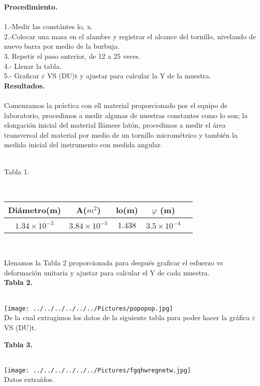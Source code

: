 \documentclass[10pt,a4paper]{article}
\begin{document}
\pagebreak 

\textbf{Procedimiento.}\\
\\
1.-Medir las const\'{a}ntes lo, x.\\
2.-Colocar una masa en el alambre y registrar el alcance del tornillo, nivelando de nuevo barra por medio de la burbuja.\\
3. Repetir el paso anterior, de 12 a 25 veces.\\
4.- Llenar la tabla.\\
5.- Graficar $\varepsilon$ VS (DU)t y ajustar para calcular la Y de la muestra.\\

\textbf{Resultados.}\\
\\
Comenzamos la pr\'{a}ctica con ell material proporcionado por el equipo de laboratorio, procedimos a medir algunas de nuestras constantes como lo son; la elongaci\'{o}n inicial del material ll\'{a}mese lat\'{o}n, procedimos a medir el \'{a}rea transversal del material por medio de un tornillo microm\'{e}trico y tambi\'{e}n la medida inicial del instrumento con medida angular. \\
\medskip
\\
\medskip
\medskip
\caption{Tabla 1.} 
\\
\begin{tabular}{|c|c|c|c|c|}
\hline 
Di\'{a}metro(m) & A(${ m }^{ 2 }$) & lo(m)& $\varphi$ (m)\\ 
\hline 
${ 1.34\times 10 }^{ -3 }$ & ${ 3.84\times 10 }^{ -5 }$ & 1.438 & ${ 3.5\times 10 }^{ -4 }$ \\
\hline 
\end{tabular}\\


\medskip

Llenamos la Tabla 2 proporcionada para despu\'{e}s graficar el esfuerzo vs deformaci\'{o}n unitaria y ajustar para calcular el Y de cada muestra.\\
\textbf{Tabla 2.}\\
\\
\begin{figure 2}
\centering
\texttt{[image: ../../../../../../Pictures/popopop.jpg]} 
\\
\caption{De la cual extragimos los datos de la siguiente tabla para poder hacer la gr\'{a}fica $\varepsilon$ VS (DU)t.}
\end{figure 2}

\begin{figure 3}
\centering
\caption{\textbf{Tabla 3.}}
\\
\texttt{[image: ../../../../../../Pictures/fgqhwregnetw.jpg]} 
\\
\caption{Datos extra\'{i}dos.}
\end{figure 3}
\end{document}
